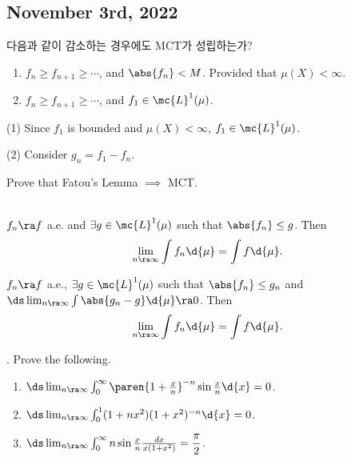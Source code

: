 \subsection*{November 3rd, 2022}

\question 다음과 같이 감소하는 경우에도 MCT가 성립하는가?
\begin{enumerate}
    \item \(f_n\geq f_{n+1} \geq \cdots\), and \(\abs{f_n} < M\). Provided that \(\mu(X) < \infty\).
    \item \(f_n\geq f_{n+1} \geq \cdots\), and \(f_1 \in \mc{L}^{1}(\mu)\).
\end{enumerate}

\pf
(1) Since \(f_1\) is bounded and \(\mu(X) < \infty\), \(f_1 \in \mc{L}^{1}(\mu)\).

(2) Consider \(g_n = f_1 - f_n\).

\question Prove that Fatou's Lemma \(\implies\) MCT.

  \\
\(f_n \ra f\) a.e. and \(\exists g \in \mc{L}^{1}(\mu)\) such that \(\abs{f_n} \leq g\). Then
\[
    \lim_{n \ra \infty} \int f_n \d{\mu} = \int f \d{\mu}.
\]

\rmk \(f_n \ra f\) a.e.,  \(\exists g\in \mc{L}^{1}(\mu)\) such that \(\abs{f_n} \leq g_n\) and \(\ds \lim_{n \ra \infty} \int \abs{g_n - g} \d{\mu} \ra 0\). Then
\[
    \lim_{n \ra \infty} \int f_n \d{\mu} = \int f \d{\mu}.
\]



\prob. Prove the following.
\begin{enumerate}
    \item \(\ds \lim_{n \ra \infty} \int_{0}^{\infty} \paren{1 + \frac{x}{n}}^{-n} \sin \frac{x}{n} \d{x} = 0\).
    \item \(\ds \lim_{n \ra \infty} \int_{0}^{1} (1+nx^2)(1+x^2)^{-n} \d{x} = 0\).
    \item \(\ds \lim_{n \ra \infty} \int_{0}^{\infty} n \sin\frac{x}{n} \frac{dx}{x(1+x^2)} = \dfrac{\pi}{2}\).
\end{enumerate}

\pagebreak
